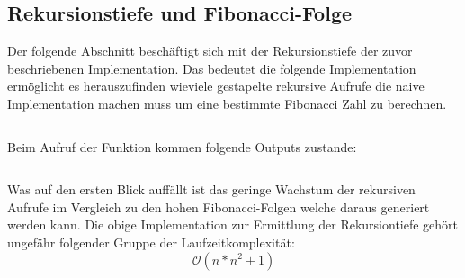 \subsection{Rekursionstiefe und Fibonacci-Folge}
Der folgende Abschnitt beschäftigt sich mit der Rekursionstiefe
der zuvor beschriebenen Implementation. Das bedeutet die
folgende Implementation ermöglicht es herauszufinden wieviele
gestapelte rekursive Aufrufe die naive Implementation machen
muss um eine bestimmte Fibonacci Zahl zu berechnen.
\begin{mdframed}[backgroundcolor=bg]
    \inputminted{Python}{src/count_fibonacci.py}
\end{mdframed}
Beim Aufruf der Funktion kommen folgende Outputs zustande:
\begin{mdframed}[backgroundcolor=bg]
    \inputminted{Python}{src/count_fibonacci_test.py}
\end{mdframed}
Was auf den ersten Blick auffällt ist das geringe Wachstum 
der rekursiven Aufrufe im Vergleich zu den hohen Fibonacci-Folgen
welche daraus generiert werden kann. Die obige Implementation
zur Ermittlung der Rekursiontiefe gehört ungefähr folgender 
Gruppe der Laufzeitkomplexität:
\begin{equation}
    \mathcal{O}(n*n^2 + 1)
\end{equation}